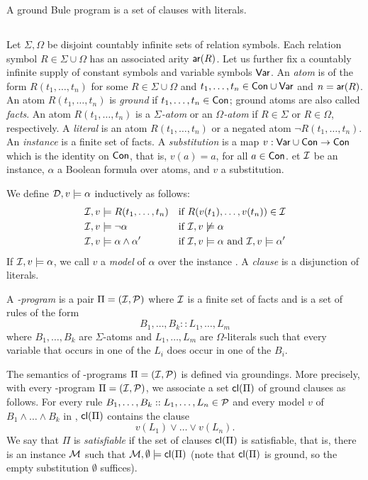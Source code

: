 \documentclass[conference]{IEEEtran}
\begin{document}
A ground Bule program is a set of clauses with literals. 

\subsection{\bcore}

Let $\Sigma,\Omega$ be disjoint countably infinite sets of relation symbols.  
Each relation symbol $R\in \Sigma\cup\Omega$ has an associated arity $\mathsf{ar}(R)$.  
Let us further fix a countably infinite supply of constant symbols  and variable symbols $\mathsf{Var}$.  
An \emph{atom} is of the form $R(t_1,\ldots,t_n)$ for some $R\in \Sigma\cup\Omega$ and $t_1,\ldots,t_n\in\mathsf{Con}\cup\mathsf{Var}$ and $n=\mathsf{ar}(R)$. 
An atom $R(t_1,\ldots,t_n)$ is \emph{ground} if $t_1,\ldots,t_n\in\mathsf{Con}$; ground atoms are also called \emph{facts}. 
An atom $R(t_1,\ldots,t_n)$ is a \emph{$\Sigma$-atom} or an \emph{$\Omega$-atom} if $R\in \Sigma$ or $R\in \Omega$, respectively. 
A \emph{literal} is an atom $R(t_1,\ldots,t_n)$ or a negated atom $\neg R(t_1,\ldots,t_n)$. 
An \emph{instance} is a finite set of facts. A \emph{substitution} is a map $v:\mathsf{Var}\cup\mathsf{Con}\to\mathsf{Con}$ which is the identity on $\mathsf{Con}$, that is, $v(a)=a$, for all $a\in\mathsf{Con}$.
et $\mathcal{I}$ be an instance, $\alpha$ a Boolean formula over atoms, and $v$ a substitution. 

We define $\mathcal{D},v\models \alpha$ inductively as follows: 
%
\begin{align*}
  \mathcal{I},v & \models R(t_1,\ldots,t_n) && \text{if
  $R(v(t_1),\ldots,v(t_n))\in \mathcal{I}$} \\
  \mathcal{I}, v& \models \neg \alpha && \text{if $\mathcal{I},v\not\models \alpha$}
  \\
  \mathcal{I}, v& \models \alpha \wedge \alpha' && \text{if $\mathcal{I},v\models
  \alpha$ and $\mathcal{I},v\models\alpha'$}
\end{align*}
%
If $\mathcal{I},v\models\alpha$, we call $v$ a \emph{model} of $\alpha$ over the instance \Imc. 
A \emph{clause} is a disjunction of literals.

A \emph{\bcore-program} is a pair $\Pi=(\mathcal{I},\mathcal{P})$ where $\mathcal{I}$ is a finite set of facts and \Pmc is a set of rules of the form 
%
\[B_1, \ldots, B_k :: L_1, \ldots, L_m\]
%
where $B_1,\ldots,B_k$ are $\Sigma$-atoms and $L_1,\ldots,L_m$ are $\Omega$-literals such that every variable that occurs in one of the $L_i$ does occur in one of the $B_i$.

The semantics of \bcore-programs $\Pi=(\mathcal{I},\mathcal{P})$ is defined via groundings. 
More precisely, with every \bcore-program $\Pi=(\mathcal{I},\mathcal{P})$, we associate a set $\mathsf{cl}(\Pi)$ of ground clauses as follows.  
For every rule $B_1,\ldots,B_k :: L_1,\ldots, L_n\in\mathcal{P}$ and every model $v$ of $B_1\wedge\ldots\wedge B_k$ in \Imc, $\mathsf{cl}(\Pi)$ contains the clause
%
\[v(L_1)\vee\ldots\vee v(L_n).\]
%
We say that $\Pi$ is \emph{satisfiable} if the set of clauses $\mathsf{cl}(\Pi)$ is satisfiable, that is, 
there is an instance $\mathcal{M}$ such that $\mathcal{M},\emptyset \models\mathsf{cl}(\Pi)$ (note that $\mathsf{cl}(\Pi)$ is ground, so the empty substitution $\emptyset$ suffices).
\end{document}
